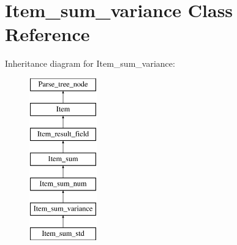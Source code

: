 \hypertarget{classItem__sum__variance}{}\section{Item\+\_\+sum\+\_\+variance Class Reference}
\label{classItem__sum__variance}
Inheritance diagram for Item\+\_\+sum\+\_\+variance\+:\begin{figure}[H]
\begin{center}
\leavevmode
\includegraphics[height=7.000000cm]{classItem__sum__variance}
\end{center}
\end{figure}
